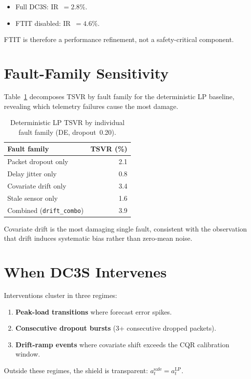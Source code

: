 \begin{itemize}
  \item Full DC3S: IR~$= 2.8$\%.
  \item FTIT disabled: IR~$= 4.6$\%.
\end{itemize}

FTIT is therefore a performance refinement, not a safety-critical component.

\section{Fault-Family Sensitivity}

Table~\ref{tab:fault-sensitivity} decomposes TSVR by fault family for the
deterministic LP baseline, revealing which telemetry failures cause the
most damage.

\begin{table}[ht]
\centering
\caption{Deterministic LP TSVR by individual fault family (DE, dropout~0.20).}
\label{tab:fault-sensitivity}
\begin{tabular}{lr}
\toprule
\textbf{Fault family} & \textbf{TSVR (\%)} \\
\midrule
Packet dropout only       & 2.1 \\
Delay jitter only         & 0.8 \\
Covariate drift only      & 3.4 \\
Stale sensor only          & 1.6 \\
Combined (\texttt{drift\_combo}) & 3.9 \\
\bottomrule
\end{tabular}
\end{table}

Covariate drift is the most damaging single fault, consistent with the
observation that drift induces systematic bias rather than zero-mean noise.

\section{When DC3S Intervenes}

Interventions cluster in three regimes:
\begin{enumerate}
  \item \textbf{Peak-load transitions} where forecast error spikes.
  \item \textbf{Consecutive dropout bursts} (3+ consecutive dropped packets).
  \item \textbf{Drift-ramp events} where covariate shift exceeds the CQR
    calibration window.
\end{enumerate}
Outside these regimes, the shield is transparent: $a_t^{\text{safe}} = a_t^{\text{LP}}$.

